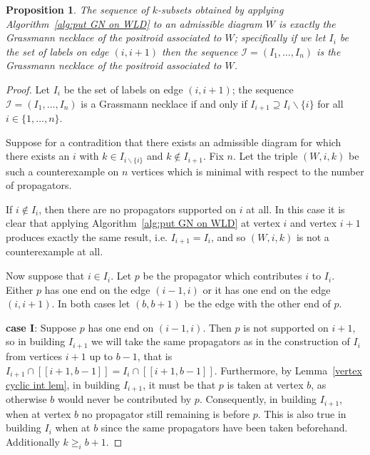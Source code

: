 \documentclass[11pt]{article}
\newcommand{\II}{\mathcal{I}}
\newcommand{\interval}[2]{[\![#1,#2]\!]}
\newtheorem{prop}[thm]{Proposition}
\theoremstyle{remark}
\theoremstyle{definition}
\begin{document}
\begin{prop}\label{res:alg gives GN}
The sequence of $k$-subsets obtained by applying Algorithm~\ref{alg:put GN on WLD} to an admissible diagram $W$ is exactly the Grassmann necklace of the positroid associated to $W$; specifically if we let  $I_i$ be the set of labels on edge $(i,i+1)$ then the sequence $\II = (I_1, \dots, I_n)$ is the Grassmann necklace of the positroid associated to $W$.
\end{prop}

\begin{proof}
Let $I_i$ be the set of labels on edge $(i,i+1)$; the sequence $\II = (I_1, \dots, I_n)$ is a Grassmann necklace if and only if $I_{i+1} \supseteq I_i \backslash \{i\}$ for all $i \in \{1, \dots, n\}$.


Suppose for a contradition that there exists an admissible diagram for which there exists an $i$ with $k\in I_{i\backslash\{i\}}$ and $k \not\in I_{i+1}$.  Fix $n$.  Let the triple $(W, i, k)$ be such a counterexample on $n$ vertices which is minimal with respect to the number of propagators. %

If $i \not\in I_i$, then there are no propagators supported on $i$ at all.  In this case it is clear that applying Algorithm~\ref{alg:put GN on WLD} at vertex $i$ and vertex $i+1$ produces exactly the same result, i.e. $I_{i+1} = I_i$, and so $(W, i, k)$ is not a counterexample at all.

Now suppose that $i \in I_i$.  Let $p$ be the propagator which contributes $i$ to $I_i$.  Either $p$ has one end on the edge $(i-1, i)$ or it has one end on the edge $(i, i+1)$.  In both cases let $(b, b+1)$ be the edge with the other end of $p$.

\textbf{case I}:  Suppose $p$ has one end on $(i-1, i)$.  Then $p$ is not supported on $i+1$, so in building $I_{i+1}$ we will take the same propagators as in the construction of $I_i$ from vertices $i+1$ up to $b-1$, that is $I_{i+1} \cap \interval{i+1}{b-1} = I_{i} \cap \interval{i+1}{b-1}$.  Furthermore, by Lemma~\ref{vertex cyclic int lem}, in building $I_{i+1}$, it must be that $p$ is taken at vertex $b$, as otherwise $b$ would never be contributed by $p$.    Consequently, in building $I_{i+1}$, when at vertex $b$ no propagator still remaining is before $p$.  This is also true in building $I_i$ when at $b$ since the same propagators have been taken beforehand.  Additionally $k\geq_i b+1$.


\end{proof}
\end{document}
